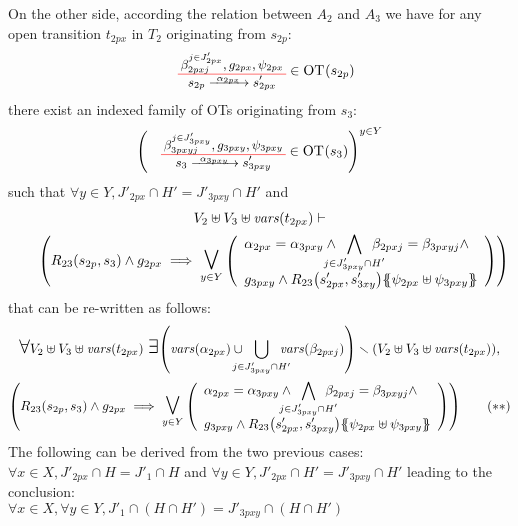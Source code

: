 \documentclass[runningheads]{llncs}
\begin{document}
\begin{enumerate}
On the other side, according the relation between $A_2$ and $A_3$ we have for any open transition $t_{2px}$ in $T_2$ originating from $s_{2p}$:
\begin{align*}
\OTx{2p}{x}{2px}{2px} \in \fOT{s_{2p}}
\end{align*}
there exist an indexed family of OTs originating from $s_3$: 
\begin{align*}
\mpar{\OTx{3}{pxy}{3pxy}{3pxy} \in \fOT{s_3}}^{y \in Y} 
\end{align*}
such that $\forall y \in Y, J'_{2px} \cap H' = J'_{3pxy} \cap H'$ and
\begin{multline*}
\everymath{\displaystyle}
V_2 \uplus V_3 \uplus \fvars{t_{2px}} \vdash\\\hspace{2em} \mpar{R_{23}\mpar{s_{2p}, s_{3}} \wedge g_{2px} \implies \operatorname*{\bigsymb{\bigvee}}_{y \in Y} \mpar{\everymath{\displaystyle}
\begin{array}{l}
			 \alpha_{2px}=\alpha_{3pxy} \wedge \bigwedge_\subbox{j \in J'_{3pxy} \cap H'} \beta_{2pxj}=\beta_{3pxyj} \nwedge \\
			g_{3pxy} \wedge R_{23}\mpar{s'_{2px}, s'_{3xy}}\psubst{\psi_{2px} \uplus \psi_{3pxy}}
		\end{array}}} 
\end{multline*}
that can be re-written as follows:
\begin{multline*}
\everymath{\displaystyle}
\bigforall V_2 \uplus V_3 \uplus \fvars{t_{2px}}\,\,\bigexists \mpar{\fvars{\alpha_{2px}} \cup\!\!\!\!\!\! \bigcup_{j \in J'_{3pxy}
\cap H'}\!\! \!\!\!\!\fvars{\beta_{2pxj}}} \setminus \mpar{V_2 \uplus V_3 \uplus \fvars{t_{2px}}},\\ \mpar{R_{23}\mpar{s_{2p}, s_{3}} \wedge g_{2px} \implies \operatorname*{\bigsymb{\bigvee}}_{y \in Y} \mpar{\everymath{\displaystyle}
\begin{array}{l}
			 \alpha_{2px}=\alpha_{3pxy} \wedge \bigwedge_\subbox{j \in J'_{3pxy} \cap H'} \beta_{2pxj}=\beta_{3pxyj} \nwedge\\
			 g_{3pxy} \wedge R_{23}\mpar{s'_{2px}, s'_{3pxy}}\psubst{\psi_{2px} \uplus \psi_{3pxy}}
		\end{array}}} \qquad (**)
\end{multline*}
The following  can be derived from the two previous cases: \\
$\forall x \in X, J'_{2px} \cap H = J'_1 \cap H$ and
$\forall y \in Y, J'_{2px} \cap H' = J'_{3pxy} \cap H'$ leading to the conclusion:\\
$\forall x \in X, \forall y \in Y,  J'_1 \cap (H \cap H') = J'_{3pxy} \cap (H\cap H')$ \\

\end{enumerate}
\end{document}
